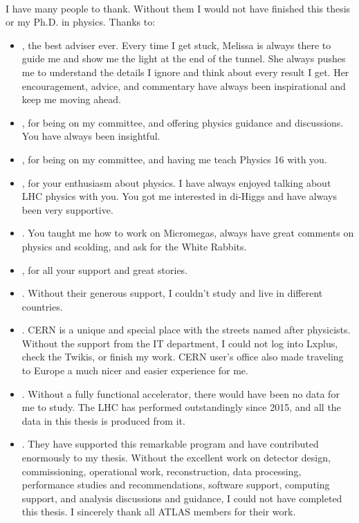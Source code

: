 
\paragraph{}
I have many people to thank. Without them I would not have finished this thesis or my Ph.D. in physics. Thanks to:
\begin{itemize}
	\item {}, the best adviser ever. Every time I get stuck, Melissa is always there to guide me and show me the light at the end of the tunnel. She always pushes me to understand the details I ignore and think about every result I get. Her encouragement, advice, and commentary have always been inspirational and keep me moving ahead.
	\item {}, for being on my committee, and offering physics guidance and discussions. You have always been insightful.
	\item {}, for being on my committee, and having me teach Physics 16 with you.
	\item {}, for your enthusiasm about physics. I have always enjoyed talking about LHC physics with you. You got me interested in di-Higgs and have always been very supportive.
	\item {}. You taught me how to work on Micromegas, always have great comments on physics and scolding, and ask for the White Rabbits.
	\item {}, for all your support and great stories.
	\item {}. Without their generous support, I couldn't study and live in different countries.
	\item {}. CERN is a unique and special place with the streets named after physicists. Without the support from the IT department, I could not log into Lxplus, check the Twikis, or finish my work. CERN user's office also made traveling to Europe a much nicer and easier experience for me.
	\item {}. Without a fully functional accelerator, there would have been no data for me to study. The LHC has performed outstandingly since 2015, and all the data in this thesis is produced from it. 
	\item {}. They have supported this remarkable program and have contributed enormously to my thesis. Without the excellent work on detector design, commissioning, operational work, reconstruction, data processing, performance studies and recommendations, software support, computing support, and analysis discussions and guidance, I could not have completed this thesis. I sincerely thank all ATLAS members for their work.

\end{itemize}

